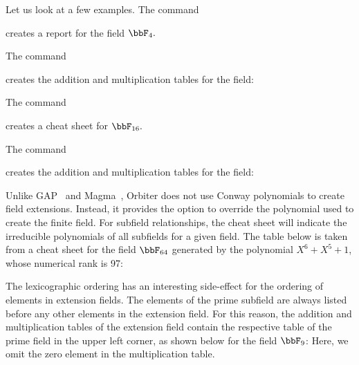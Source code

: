 \bigskip

Let us look at a few examples. 
The command 


creates a report for the field $\bbF_4.$

\bigskip


The command  


creates the addition and multiplication tables for the field:


\bigskip


The command 


creates a cheat sheet for $\bbF_{16}.$


\bigskip

The command  


creates the addition and multiplication tables for the field:


\bigskip





Unlike  GAP~\cite{GAP} and Magma~\cite{Magma},
Orbiter does not use 
Conway polynomials to create field extensions. 
Instead, it  
provides the option to override the polynomial used to create the finite field.
For subfield relationships, the cheat sheet will indicate the irreducible polynomials 
of all subfields for a given field.  
The table below is taken from a cheat sheet for the field $\bbF_{64}$ 
generated by the polynomial $X^{6} + X^{5} + 1$,  whose numerical rank is 97:

\bigskip

The lexicographic ordering has an interesting 
side-effect for the ordering of elements in extension fields. 
The elements of the prime subfield are always listed before 
any other elements in the extension field. 
For this reason, the addition and multiplication tables of the extension field contain the 
respective table of the prime field in the upper left corner, 
as shown below for the field $\bbF_9$:
Here, we omit the zero element in the multiplication table.


\bigskip

